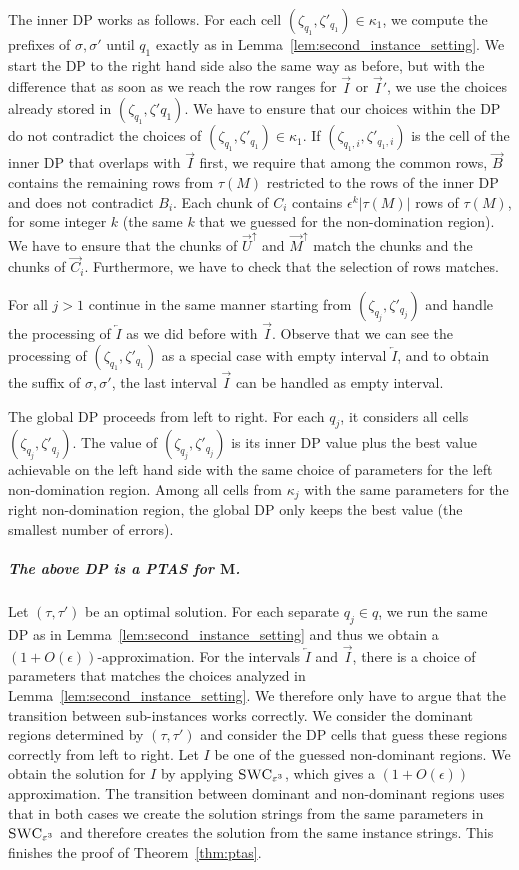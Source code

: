 The inner DP works as follows.
For each cell $(\zeta_{q_1},\zeta'_{q_1}) \in \kappa_1$, we compute the prefixes of $\sigma,\sigma'$ until $q_1$ exactly as in Lemma~\ref{lem:second_instance_setting}.
We start the DP to the right hand side also the same way as before, but with the difference that as soon as we reach the row ranges for $\overrightarrow{I}$ or $\overrightarrow{I}'$, we use the choices already stored in $(\zeta_{q_1},\zeta'{q_1})$.
We have to ensure that our choices within the DP do not contradict the choices of  $(\zeta_{q_1},\zeta'_{q_1}) \in \kappa_1$. 
If $(\zeta_{q_1,i},\zeta'_{q_1,i})$ is the cell of the inner DP that overlaps with $\overrightarrow{I}$ first, we require that among the common rows, $\overrightarrow{B}$ contains the remaining rows from $\tau(M)$ restricted to the rows of the inner DP and does not contradict $B_i$. 
Each chunk of $C_i$ contains $\epsilon^k |\tau(M)|$ rows of $\tau(M)$, for some integer $k$ (the same $k$ that we guessed for the non-domination region). 
We have to ensure that the chunks of $\overrightarrow{U}^\uparrow$ and $\overrightarrow{M}^\uparrow$ match the chunks and the chunks of $\overrightarrow{C}_i$.
Furthermore, we have to check that the selection of rows matches.

For all $j > 1$ continue in the same manner starting from $(\zeta_{q_j},\zeta'_{q_j})$ and handle the processing of $\overleftarrow{I}$ as we did before with $\overrightarrow{I}$.
Observe that we can see the processing of $(\zeta_{q_1},\zeta'_{q_1})$ as a special case with empty interval $\overleftarrow{I}$, and to obtain the suffix of $\sigma,\sigma'$, the last interval $\overrightarrow{I}$ can be handled as empty interval.

The global DP proceeds from left to right. For each $q_j$, it considers all cells $(\zeta_{q_j},\zeta'_{q_j})$.
The value of $(\zeta_{q_j},\zeta'_{q_j})$ is its inner DP value plus the best value achievable on the left hand side with the same choice of parameters for the left non-domination region.
Among all cells from $\kappa_j$ with the same parameters for the right non-domination region, the global DP only keeps the best value (the smallest number of errors).

\subparagraph{The above DP is a PTAS for $\mathbf{M}$.} 
Let $(\tau,\tau')$ be an optimal solution.
For each separate $q_j \in q$, we run the same DP as in Lemma~\ref{lem:second_instance_setting} and thus we obtain a $(1+O(\epsilon))$-approximation.
For the intervals $\overleftarrow{I}$ and $\overrightarrow{I}$, there is a choice of parameters that matches the choices analyzed in Lemma~\ref{lem:second_instance_setting}.
We therefore only have to argue that the transition between sub-instances works correctly.
We consider the dominant regions determined by $(\tau,\tau')$ and consider the DP cells that guess these regions correctly from left to right.
Let $I$ be one of the guessed non-dominant regions.
We obtain the solution for $I$ by applying $\textsc{SWC}_{\varepsilon^3}$, which gives a $(1+O(\epsilon))$ approximation.
The transition between dominant and non-dominant regions uses that in both cases we create the solution strings from the same parameters in $\textsc{SWC}_{\varepsilon^3}$ and therefore creates the solution from the same instance strings.
This finishes the proof of Theorem~\ref{thm:ptas}.

